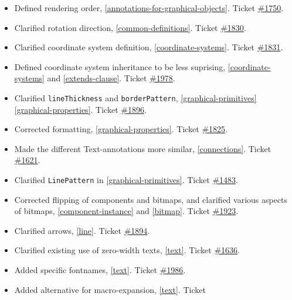 \begin{itemize}
\item
  Defined rendering order, \cref{annotations-for-graphical-objects}. Ticket
  \href{https://github.com/modelica/ModelicaSpecification/issues/1750}{\#1750}.
\item
  Clarified rotation direction, \cref{common-definitions}. Ticket
  \href{https://github.com/modelica/ModelicaSpecification/issues/1830}{\#1830}.
\item
  Clarified coordinate system definition, \cref{coordinate-systems}. Ticket
  \href{https://github.com/modelica/ModelicaSpecification/issues/1831}{\#1831}.
\item
  Defined coordinate system inheritance to be less suprising,
  \cref{coordinate-systems} and \cref{extends-clause}. Ticket
  \href{https://github.com/modelica/ModelicaSpecification/issues/1978}{\#1978}.
\item
  Clarified \lstinline!lineThickness! and \lstinline!borderPattern!, \cref{graphical-primitives} \cref{graphical-properties}.
  Ticket \href{https://github.com/modelica/ModelicaSpecification/issues/1896}{\#1896}.
\item
  Corrected formatting, \cref{graphical-properties}. Ticket
  \href{https://github.com/modelica/ModelicaSpecification/issues/1825}{\#1825}.
\item
  Made the different Text-annotations more similar, \cref{connections}.
  Ticket \href{https://github.com/modelica/ModelicaSpecification/issues/1621}{\#1621}.
\item
  Clarified \lstinline!LinePattern! in \cref{graphical-primitives}.
  Ticket \href{https://github.com/modelica/ModelicaSpecification/issues/1483}{\#1483}.
\item
  Corrected flipping of components and bitmaps, and clarified various
  aspects of bitmaps, \cref{component-instance} and \cref{bitmap}. Ticket
  \href{https://github.com/modelica/ModelicaSpecification/issues/1923}{\#1923}.
\item
  Clarified arrows, \cref{line}. Ticket
  \href{https://github.com/modelica/ModelicaSpecification/issues/1894}{\#1894}.
\item
  Clarified existing use of zero-width texts, \cref{text}. Ticket
  \href{https://github.com/modelica/ModelicaSpecification/issues/1636}{\#1636}.
\item
  Added specific fontnames, \cref{text}. Ticket
  \href{https://github.com/modelica/ModelicaSpecification/issues/1986}{\#1986}.
\item
  Added alternative for macro-expansion, \cref{text}. Ticket

\end{itemize}
